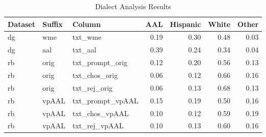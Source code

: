 \begin{table}[htbp]
\centering
\caption{Dialect Analysis Results}
\label{tab:dialect-analysis}
\begin{tabular}{lllrrrr}
\toprule
 Dataset   & Suffix   & Column           &   AAL &   Hispanic &   White &   Other \\
\midrule
 dg        & wme      & txt\_wme          &  0.19 &       0.30 &    0.48 &    0.03 \\
 dg        & aal      & txt\_aal          &  0.39 &       0.24 &    0.34 &    0.04 \\
 rb        & orig     & txt\_prompt\_orig  &  0.12 &       0.20 &    0.56 &    0.13 \\
 rb        & orig     & txt\_chos\_orig    &  0.06 &       0.12 &    0.66 &    0.16 \\
 rb        & orig     & txt\_rej\_orig     &  0.06 &       0.13 &    0.68 &    0.13 \\
 rb        & vpAAL    & txt\_prompt\_vpAAL &  0.15 &       0.19 &    0.50 &    0.16 \\
 rb        & vpAAL    & txt\_chos\_vpAAL   &  0.10 &       0.12 &    0.59 &    0.19 \\
 rb        & vpAAL    & txt\_rej\_vpAAL    &  0.10 &       0.13 &    0.60 &    0.16 \\
\bottomrule
\end{tabular}
\end{table}